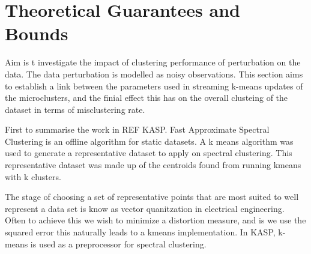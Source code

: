 \documentclass[a4document]{article}		%
\begin{document}


\section{Theoretical Guarantees and Bounds}
\label{sec:bounds}
Aim is t investigate the impact of clustering performance of perturbation on the data. The data perturbation is modelled as noisy observations. 
This section aims to establish a link between the parameters used in streaming k-means updates of the microclusters, and the finial effect this has on the overall clusteing of the dataset in terms of misclustering rate. 

First to summarise the work in REF KASP. Fast Approximate Spectral Clustering is an offline algorithm for static datasets. A k means algorithm was used to generate a representative dataset to apply on spectral clustering. This representative dataset was made up of the centroids found from running kmeans with k clusters. 

The stage of choosing a set of representative points that are most suited to well represent a data set is know as vector quanitzation in electrical engineering. Often to achieve this we wish to minimize a distortion measure, and is we use the squared error this naturally leads to a kmeans implementation. In KASP, k-means is used as a preprocessor for spectral clustering. 
\end{document}
